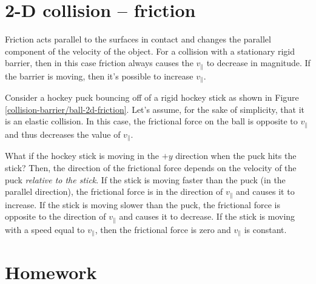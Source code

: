 \vspace{1.5in}

\section*{2-D collision -- friction}

Friction acts parallel to the surfaces in contact and changes the parallel component of the velocity of the object. For a collision with a stationary rigid barrier, then in this case friction always causes the $v_\parallel$ to decrease in magnitude. If the barrier is moving, then it's possible to increase $v_\parallel$.

Consider a hockey puck bouncing off of a rigid hockey stick as shown in Figure \ref{collision-barrier/ball-2d-friction}. Let's assume, for the sake of simplicity, that it is an elastic collision. In this case, the frictional force on the ball is opposite to $v_{\parallel}$ and thus decreases the value of $v_{\parallel}$.

What if the hockey stick is moving in the $+y$ direction when the puck hits the stick?  Then, the direction of the frictional force depends on the velocity of the puck \emph{relative to the stick}. If the stick is moving faster than the puck (in the parallel direction), the frictional force is in the direction of $v_{\parallel}$ and causes it to increase. If the stick is moving slower than the puck, the frictional force is opposite to the direction of $v_{\parallel}$ and causes it to decrease. If the stick is moving with a speed equal to $v_{\parallel}$, then the frictional force is zero and $v_{\parallel}$ is constant.



\pagebreak

\section{Homework}

